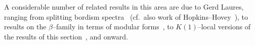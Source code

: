\begin{remark}
A considerable number of related results in this area are due to Gerd Laures, ranging from splitting bordism spectra~\cite{LauresSplitting} (cf.\ also work of Hopkins--Hovey~\cite{HopkinsHovey}), to results on the \(\beta\)--family in terms of modular forms~\cite{BehrensLaures}, to \(K(1)\)--local versions of the results of this section~\cite{KitchlooLaures}, and onward.
\end{remark}









